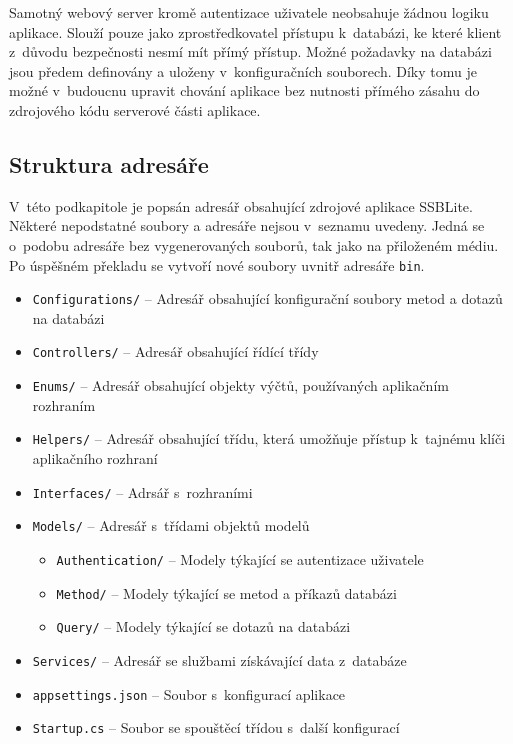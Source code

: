 Samotný webový server kromě autentizace uživatele neobsahuje žádnou logiku aplikace. Slouží pouze jako zprostředkovatel přístupu k~databázi, ke které klient z~důvodu bezpečnosti nesmí mít přímý přístup. Možné požadavky na databázi jsou předem definovány a uloženy v~konfiguračních souborech. Díky tomu je možné v~budoucnu upravit chování aplikace bez nutnosti přímého zásahu do zdrojového kódu serverové části aplikace. 


\subsection{Struktura adresáře}
V~této podkapitole je popsán adresář obsahující zdrojové aplikace SSBLite. Některé nepodstatné soubory a adresáře nejsou v~seznamu uvedeny. Jedná se o~podobu adresáře bez vygenerovaných souborů, tak jako na přiloženém médiu. Po úspěšném překladu se vytvoří nové soubory uvnitř adresáře \texttt{bin}.

\begin{itemize}
  \item \texttt{Configurations/} -- Adresář obsahující konfigurační soubory metod a dotazů na databázi
  \item \texttt{Controllers/} -- Adresář obsahující řídící třídy
  \item \texttt{Enums/} -- Adresář obsahující objekty výčtů, používaných aplikačním rozhraním
  \item \texttt{Helpers/} -- Adresář obsahující třídu, která umožňuje přístup k~tajnému klíči aplikačního rozhraní
  \item \texttt{Interfaces/} -- Adrsář s~rozhraními
  \item \texttt{Models/} -- Adresář s~třídami objektů modelů
  \begin{itemize}
    \item \texttt{Authentication/} -- Modely týkající se autentizace uživatele
    \item \texttt{Method/} -- Modely týkající se metod a příkazů databázi
    \item \texttt{Query/} -- Modely týkající se dotazů na databázi 
  \end{itemize}
  \item \texttt{Services/} -- Adresář se službami získávající data z~databáze
  \item \texttt{appsettings.json} -- Soubor s~konfigurací aplikace
  \item \texttt{Startup.cs} -- Soubor se spouštěcí třídou s~další konfigurací
\end{itemize}


